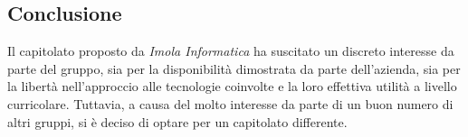 \subsection{Conclusione}{
Il capitolato proposto da \textit{Imola Informatica} ha suscitato un discreto interesse da parte del gruppo, sia per la disponibilità dimostrata da parte dell'azienda, sia per la libertà nell'approccio alle tecnologie coinvolte e la loro effettiva utilità a livello curricolare. Tuttavia, a causa del molto interesse da parte di un buon numero di altri gruppi, si è deciso di optare per un capitolato differente.
}

